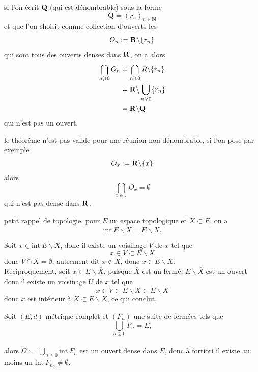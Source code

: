 \documentclass[a4paper,11pt, twoside]{article}
\begin{document}
\begin{RQ}
  si l'on écrit $\mathbf Q$ (qui est dénombrable) sous la forme 
  $$\mathbf Q=\left(r_n\right)_{n\in\mathbf N}$$
  et que l'on choisit comme collection d'ouverts les 
  $$O_n:=\mathbf R\backslash \{r_n\}$$
  qui sont tous des ouverts denses dans $\mathbf R$, on a alors
  \begin{align*}
    \bigcap_{n\geqslant 0}O_n&=\bigcap_{n\geqslant 0}R\backslash \{r_n\}\\
    &=\mathbf R\backslash \bigcup_{n\geqslant 0}\{r_n\}\\
    &=\mathbf R\backslash \mathbf Q
  \end{align*}
  qui n'est pas un ouvert.
\end{RQ}


\begin{RQ} 
  le théorème n'est pas valide pour une réunion non-dénombrable, si l'on pose par exemple
  $$O_x:=\mathbf R\backslash \{x\}$$
  alors 
  $$\bigcap_{x\in_R}O_x=\emptyset$$
  qui n'est pas dense dans $\mathbf R$.
\end{RQ}

\begin{RQ}
  petit rappel de topologie, pour $E$ un espace topologique et $X\subset E$, on a 
  $$\mathrm{int}\ E\backslash X = E\backslash \overline{X}.$$
\end{RQ}


\begin{Proof}
  Soit $x\in\mathrm{int}\ E\backslash X$, donc il existe un voisinage $V$ de $x$ tel que 
  $$x\in V\subset E\backslash X$$
  donc $V\cap X=\emptyset$, autrement dit $x\notin \overline X$, donc $x\in E\backslash \overline{X}$.\\
  Réciproquement, soit $x\in E\backslash \overline{X}$, puisque $\overline X$ est un fermé, $E\backslash\overline X$ est un ouvert donc il existe un voisinage $U$ de $x$ tel que 
  $$x\in V\subset E\backslash\overline X\subset E\backslash X$$
  donc $x$ est intérieur à $X\subset E\backslash X$, ce qui conclut.
\end{Proof}


\begin{corollaire}
  Soit $(E,d)$ métrique complet et $\left(F_n\right)$ une suite de fermées tels que 
  $$\bigcup_{n\geqslant 0}F_n=E,$$\\

  alors $\Omega:=\bigcup_{n\geqslant 0}\mathrm{int}\ F_n$ est un ouvert dense dans $E$, donc à fortiori il existe au moins un $\mathrm{int}\ {F_{n_0}}\neq\emptyset$.
\end{corollaire}
\end{document}

